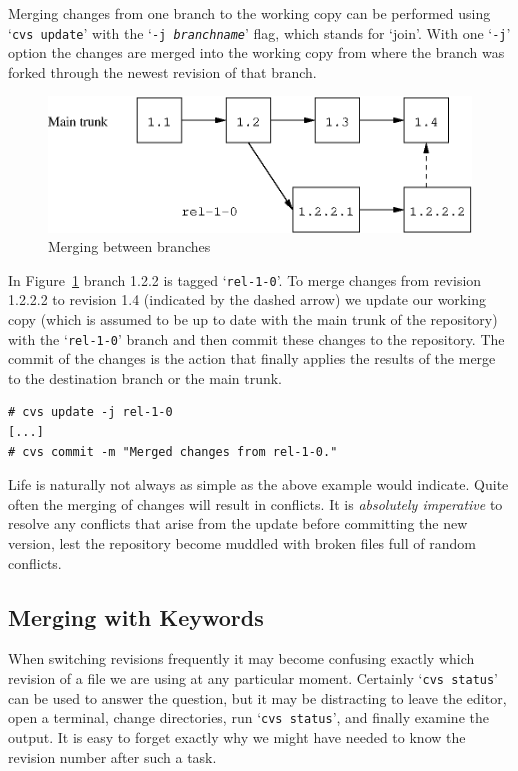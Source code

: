 \documentclass[12pt,letterpaper]{article}
\newcommand{\cmd}[1]{`\texttt{#1}'}
\begin{document}
Merging changes from one branch to the working copy can be performed using
\cmd{cvs update} with the \cmd{-j {\itshape branchname}} flag, which stands
for `join'.  With one \cmd{-j} option the changes are merged into the working
copy from where the branch was forked through the newest revision of that
branch.

\begin{figure}[htb]
\begin{center}
\includegraphics[width=\textwidth-1in]{revhist-bmerge.eps}
\end{center}
\caption{Merging between branches}
\label{fig:revhist-bmerge}
\end{figure}

In Figure~\ref{fig:revhist-bmerge} branch 1.2.2 is tagged \cmd{rel-1-0}.  To
merge changes from revision 1.2.2.2 to revision 1.4 (indicated by the dashed
arrow) we update our working copy (which is assumed to be up to date with the
main trunk of the repository) with the \cmd{rel-1-0} branch and then commit
these changes to the repository.  The commit of the changes is the action that
finally applies the results of the merge to the destination branch or the main
trunk.

\begin{Verbatim}
# cvs update -j rel-1-0
[...]
# cvs commit -m "Merged changes from rel-1-0."
\end{Verbatim}

Life is naturally not always as simple as the above example would indicate.
Quite often the merging of changes will result in conflicts.  It is
\emph{absolutely imperative} to resolve any conflicts that arise from the
update before committing the new version, lest the repository become muddled
with broken files full of random conflicts.

\subsection{Merging with Keywords}

When switching revisions frequently it may become confusing exactly which
revision of a file we are using at any particular moment.  Certainly \cmd{cvs 
status} can be used to answer the question, but it may be distracting to
leave the editor, open a terminal, change directories, run \cmd{cvs status},
and finally examine the output.  It is easy to forget exactly why we might
have needed to know the revision number after such a task.
\end{document}
